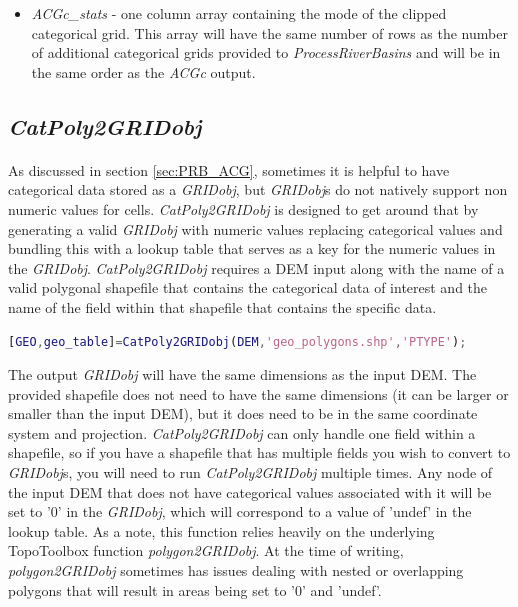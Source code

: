 \begin{enumerate}
\begin{itemize}
		\item \textit{ACGc\_stats} - one column array containing the mode of the clipped categorical grid. This array will have the same number of rows as the number of additional categorical grids provided to \textit{ProcessRiverBasins} and will be in the same order as the \textit{ACGc} output.
	\end{itemize}	
\end{enumerate}

\subsection{\textit{CatPoly2GRIDobj}} \label{sec:CatGrid}
\paragraph{}As discussed in section \ref{sec:PRB_ACG}, sometimes it is helpful to have categorical data stored as a \textit{GRIDobj}, but \textit{GRIDobj}s  do not natively support non numeric values for cells. \textit{CatPoly2GRIDobj} is designed to get around that by generating a valid \textit{GRIDobj} with numeric values replacing categorical values and bundling this with a lookup table that serves as a key for the numeric values in the \textit{GRIDobj}. \textit{CatPoly2GRIDobj} requires a DEM input along with the name of a valid polygonal shapefile that contains the categorical data of interest and the name of the field within that shapefile that contains the specific data. 

\begin{lstlisting}[language=Matlab]
% Generate a categorical grid and lookup table for a geologic map for the rock type field with the name 'PTYPE' in the input shapefile
[GEO,geo_table]=CatPoly2GRIDobj(DEM,'geo_polygons.shp','PTYPE');
\end{lstlisting}

\noindent
The output \textit{GRIDobj} will have the same dimensions as the input DEM. The provided shapefile does not need to have the same dimensions (it can be larger or smaller than the input DEM), but it does need to be in the same coordinate system and projection.  \textit{CatPoly2GRIDobj} can only handle one field within a shapefile, so if you have a shapefile that has multiple fields you wish to convert to \textit{GRIDobj}s, you will need to run \textit{CatPoly2GRIDobj} multiple times. Any node of the input DEM that does not have categorical values associated with it will be set to '0' in the \textit{GRIDobj}, which will correspond to a value of 'undef' in the lookup table. As a note, this function relies heavily on the underlying TopoToolbox function \textit{polygon2GRIDobj}. At the time of writing, \textit{polygon2GRIDobj} sometimes has issues dealing with nested or overlapping polygons that will result in areas being set to '0' and 'undef'.

